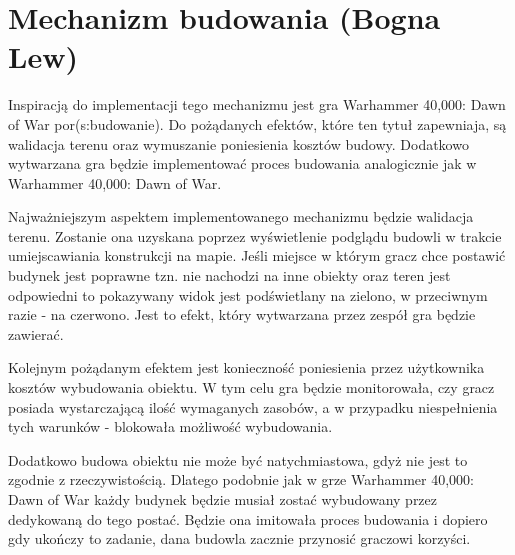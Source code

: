 \section{Mechanizm budowania (Bogna Lew)}\label{chap:build}
Inspiracją do implementacji tego mechanizmu jest gra Warhammer 40,000: Dawn of War por(s:budowanie). Do pożądanych
efektów, które ten tytuł zapewniaja, są walidacja terenu oraz wymuszanie poniesienia kosztów budowy. Dodatkowo
wytwarzana gra będzie implementować proces budowania analogicznie jak w Warhammer 40,000: Dawn of War.

Najważniejszym aspektem implementowanego mechanizmu będzie walidacja terenu. Zostanie ona uzyskana poprzez wyświetlenie
podglądu budowli w trakcie umiejscawiania konstrukcji na mapie. Jeśli miejsce w którym gracz chce postawić budynek jest
poprawne tzn. nie nachodzi na inne obiekty oraz teren jest odpowiedni to pokazywany widok jest podświetlany na zielono,
w przeciwnym razie - na czerwono. Jest to efekt, który wytwarzana przez zespół gra będzie zawierać.

Kolejnym pożądanym efektem jest konieczność poniesienia przez użytkownika kosztów
wybudowania obiektu. W tym celu gra będzie monitorowała, czy gracz posiada wystarczającą ilość wymaganych zasobów, a w
przypadku niespełnienia tych warunków - blokowała możliwość wybudowania.

Dodatkowo budowa obiektu nie może być natychmiastowa, gdyż nie jest to zgodnie z rzeczywistością. Dlatego podobnie jak w
grze Warhammer 40,000: Dawn of War każdy budynek będzie musiał zostać wybudowany przez dedykowaną do tego postać. Będzie
ona imitowała proces budowania i dopiero gdy ukończy to zadanie, dana budowla zacznie przynosić graczowi korzyści.
